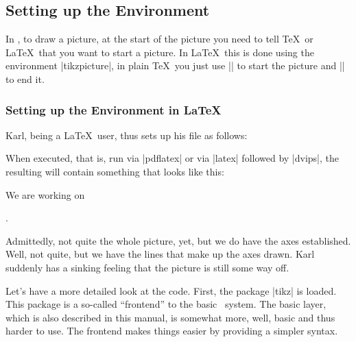 \subsection{Setting up the Environment}

In \tikzname, to draw a picture, at the start of the picture
you need to tell \TeX\ or \LaTeX\ that you want to start a picture. In
\LaTeX\ this is done using the environment |{tikzpicture}|, in plain
\TeX\ you just use |\tikzpicture| to start the picture and
|\endtikzpicture| to end it.

\subsubsection{Setting up the Environment in \LaTeX}

Karl, being a \LaTeX\ user, thus sets up his file as follows:


When executed, that is, run via |pdflatex| or via |latex| followed by
|dvips|, the resulting will contain something that looks like this:

\begin{codeexample}[width=7cm]
We are working on
.
\end{codeexample}

Admittedly, not quite the whole picture, yet, but we
do have the axes established. Well, not quite, but we have the lines
that make up the axes drawn. Karl suddenly has a sinking feeling
that the picture is still some way off. 

Let's have a more detailed look at the code. First, the package
|tikz| is loaded. This package is a so-called ``frontend'' to the
basic \pgfname\ system. The basic layer, which is also described in this
manual, is somewhat more, well, basic and thus harder to use. The
frontend makes things easier by providing a simpler syntax.

